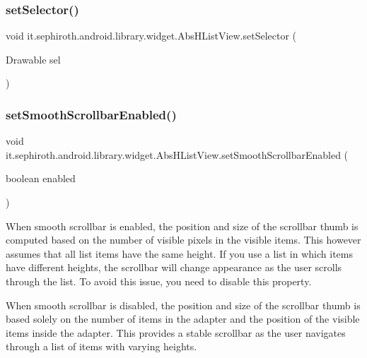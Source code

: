 \subsubsection{\texorpdfstring{set\+Selector()}{setSelector()}\hspace{0.1cm}{\footnotesize\ttfamily [2/2]}}
{\footnotesize\ttfamily void it.\+sephiroth.\+android.\+library.\+widget.\+Abs\+H\+List\+View.\+set\+Selector (\begin{DoxyParamCaption}\item[{Drawable}]{sel }\end{DoxyParamCaption})}

\mbox{\label{classit_1_1sephiroth_1_1android_1_1library_1_1widget_1_1_abs_h_list_view_a926b68b154bc94af5b3329aceff1d0fc}} 
\subsubsection{\texorpdfstring{set\+Smooth\+Scrollbar\+Enabled()}{setSmoothScrollbarEnabled()}}
{\footnotesize\ttfamily void it.\+sephiroth.\+android.\+library.\+widget.\+Abs\+H\+List\+View.\+set\+Smooth\+Scrollbar\+Enabled (\begin{DoxyParamCaption}\item[{boolean}]{enabled }\end{DoxyParamCaption})}

When smooth scrollbar is enabled, the position and size of the scrollbar thumb is computed based on the number of visible pixels in the visible items. This however assumes that all list items have the same height. If you use a list in which items have different heights, the scrollbar will change appearance as the user scrolls through the list. To avoid this issue, you need to disable this property.

When smooth scrollbar is disabled, the position and size of the scrollbar thumb is based solely on the number of items in the adapter and the position of the visible items inside the adapter. This provides a stable scrollbar as the user navigates through a list of items with varying heights.


